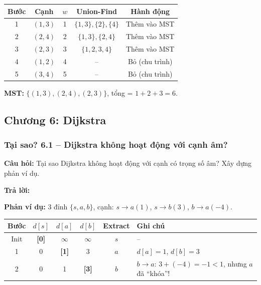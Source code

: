 \documentclass[10pt]{article}
\begin{document}
\begin{center}
\begin{tabular}{|c|c|c|c|c|}
\hline
\textbf{Bước} & \textbf{Cạnh} & \textbf{$w$} & \textbf{Union-Find} & \textbf{Hành động} \\
\hline
1 & $(1,3)$ & 1 & $\{1,3\}, \{2\}, \{4\}$ & \cellcolor{green!15} Thêm vào MST \\
\hline
2 & $(2,4)$ & 2 & $\{1,3\}, \{2,4\}$ & \cellcolor{green!15} Thêm vào MST \\
\hline
3 & $(2,3)$ & 3 & $\{1,2,3,4\}$ & \cellcolor{green!15} Thêm vào MST \\
\hline
4 & $(1,2)$ & 4 & -- & \cellcolor{red!15} Bỏ (chu trình) \\
\hline
5 & $(3,4)$ & 5 & -- & \cellcolor{red!15} Bỏ (chu trình) \\
\hline
\end{tabular}
\end{center}

\textbf{MST:} $\{(1,3), (2,4), (2,3)\}$, tổng = $1 + 2 + 3 = \boxed{6}$.

\subsection{Chương 6: Dijkstra}

\subsubsection{Tại sao? 6.1 -- Dijkstra không hoạt động với cạnh âm?}\label{whyans:6.1}

\textbf{Câu hỏi:} Tại sao Dijkstra không hoạt động với cạnh có trọng số âm? Xây dựng phản ví dụ.

\textbf{Trả lời:}

\textbf{Phản ví dụ:} 3 đỉnh $\{s, a, b\}$, cạnh: $s \to a (1)$, $s \to b (3)$, $b \to a (-4)$.

\begin{center}
\begin{tabular}{|c|c|c|c|c|l|}
\hline
\textbf{Bước} & $d[s]$ & $d[a]$ & $d[b]$ & \textbf{Extract} & \textbf{Ghi chú} \\
\hline
Init & \textbf{[0]} & $\infty$ & $\infty$ & $s$ & -- \\
\hline
1 & 0 & \textbf{[1]} & 3 & $a$ & $d[a]=1$, $d[b]=3$ \\
\hline
2 & 0 & 1 & \textbf{[3]} & $b$ & $b \to a$: $3+(-4)=-1 < 1$, nhưng $a$ đã ``khóa''! \\
\hline
\end{tabular}
\end{center}
\end{document}
